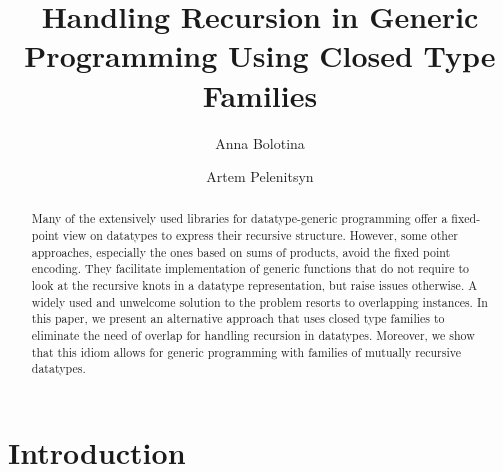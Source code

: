 \documentclass[runningheads]{llncs}
\begin{document}
%
\title{Handling Recursion in Generic Programming Using Closed Type Families}
%
%
\author{Anna Bolotina \and
Artem Pelenitsyn
}
%
%
%
\maketitle              %
%
\begin{abstract}
Many of the extensively used libraries for datatype-generic programming offer a fixed-point view on datatypes to express their recursive structure. However, some other approaches, especially the ones based on sums of products, avoid the fixed point encoding. They facilitate implementation of generic functions that do not require to look at the recursive knots in a datatype representation, but raise issues otherwise. A widely used and unwelcome solution to the problem resorts to overlapping instances. In this paper, we present an alternative approach that uses closed type families to eliminate the need of overlap for handling recursion in datatypes. Moreover, we show that this idiom allows for generic programming with families of mutually recursive datatypes.


\end{abstract}
%
%
%
\section{Introduction}
\label{sec:introduction}
\end{document}
